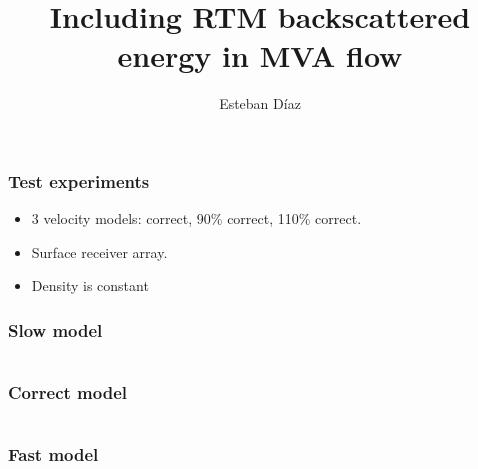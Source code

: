 

\title[]{Including RTM backscattered energy in MVA flow}
\subtitle{}
\author[]{Esteban  D\'{i}az}
\date{}
\logo{}

\def\big#1{\begin{center} \LARGE \textbf{#1} \end{center}}
\def\cen#1{\begin{center}        \textbf{#1} \end{center}}

 { \cwpcover }

\begin{frame} \frametitle{Test experiments}
\begin{itemize}
   \item 3 velocity models: correct, 90\% correct, 110\% correct.
   \item Surface receiver array.
   \item Density is constant
\end{itemize}
\end{frame}
\cwpnote{}

\begin{frame} \frametitle{Slow model}
  \begin{columns}
  \end{columns}
\end{frame}

\begin{frame} \frametitle{Correct model}
  \begin{columns}
  \end{columns}
\end{frame}

\begin{frame} \frametitle{Fast model}
  \begin{columns}
  \end{columns}
\end{frame}


